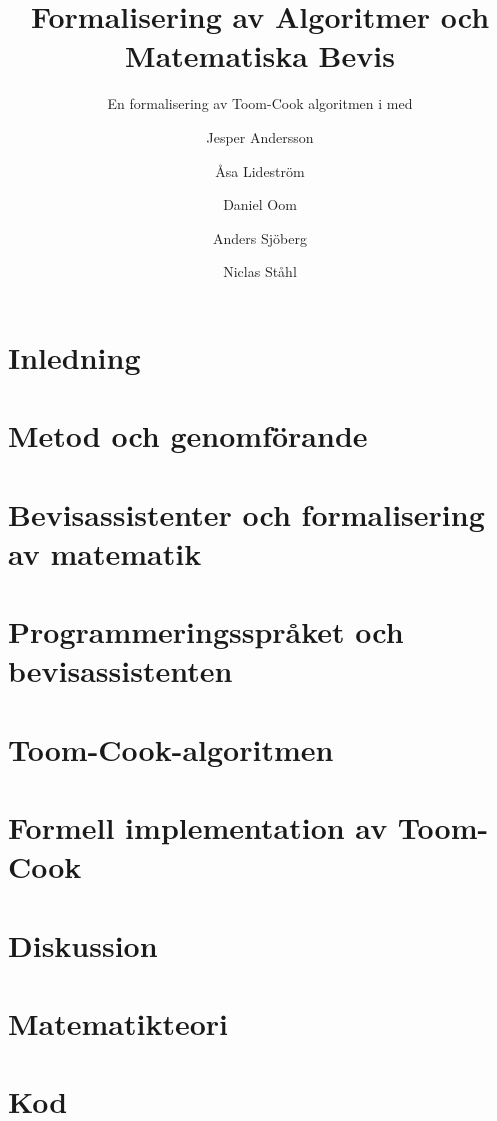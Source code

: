\documentclass[bachelors,a4paper,gu]{chalmers-thesis}
\title{Formalisering av Algoritmer och Matematiska Bevis}
\subtitle{En formalisering av Toom-Cook algoritmen i \coq{} med \ssr{}}
\author{Jesper Andersson\and Åsa Lideström\and Daniel Oom\and Anders Sjöberg\and Niclas Ståhl}
\begin{document}
\maketitle

\chapter{Inledning}
\label{sec:inledning}


\newpage
\chapter{Metod och genomförande}
\label{sec:metod}


\newpage
\chapter{Bevisassistenter och formalisering av matematik}
\label{sec:formalisering}


\newpage
\chapter{Programmeringsspråket och bevisassistenten \coq}
\label{sec:coq}







\newpage
\chapter{Toom-Cook-algoritmen}
\label{sec:toomcook}






\newpage
\chapter{Formell implementation av Toom-Cook}
\label{sec:formell}



\newpage
\chapter{Diskussion}
\label{sec:diskussion}







\newpage
\nocite{*}
\printbibliography

\appendix
\newpage
\chapter{Matematikteori}

\chapter{Kod}


\end{document}
